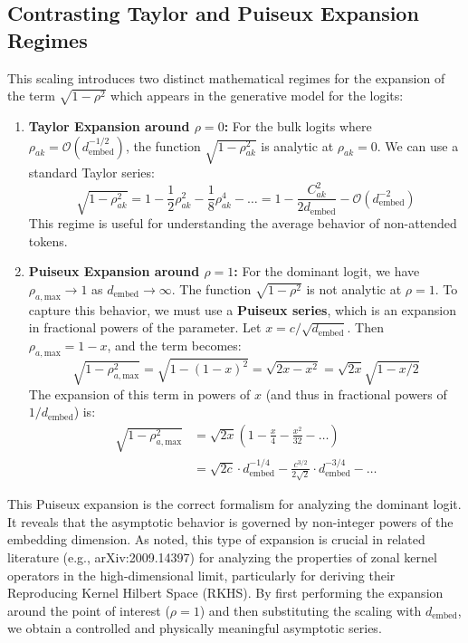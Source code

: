 \documentclass[12pt]{article}
\begin{document}
\subsection{Contrasting Taylor and Puiseux Expansion Regimes}
This scaling introduces two distinct mathematical regimes for the expansion of the term $\sqrt{1-\rho^2}$ which appears in the generative model for the logits:
\begin{enumerate}
    \item \textbf{Taylor Expansion around $\rho=0$:} For the bulk logits where $\rho_{ak} = \mathcal{O}(d_{\text{embed}}^{-1/2})$, the function $\sqrt{1-\rho_{ak}^2}$ is analytic at $\rho_{ak}=0$. We can use a standard Taylor series:
    \[ \sqrt{1-\rho_{ak}^2} = 1 - \frac{1}{2}\rho_{ak}^2 - \frac{1}{8}\rho_{ak}^4 - \dots = 1 - \frac{C_{ak}^2}{2 d_{\text{embed}}} - \mathcal{O}(d_{\text{embed}}^{-2}) \]
    This regime is useful for understanding the average behavior of non-attended tokens.

    \item \textbf{Puiseux Expansion around $\rho=1$:} For the dominant logit, we have $\rho_{a, \text{max}} \to 1$ as $d_{\text{embed}} \to \infty$. The function $\sqrt{1-\rho^2}$ is not analytic at $\rho=1$. To capture this behavior, we must use a \textbf{Puiseux series}, which is an expansion in fractional powers of the parameter. Let $x = c/\sqrt{d_{\text{embed}}}$. Then $\rho_{a, \text{max}} = 1-x$, and the term becomes:
    \[ \sqrt{1-\rho_{a, \text{max}}^2} = \sqrt{1-(1-x)^2} = \sqrt{2x - x^2} = \sqrt{2x}\sqrt{1 - x/2} \]
    The expansion of this term in powers of $x$ (and thus in fractional powers of $1/d_{\text{embed}}$) is:
    \begin{align*}
    \sqrt{1-\rho_{a, \text{max}}^2} &= \sqrt{2x} \left(1 - \frac{x}{4} - \frac{x^2}{32} - \dots\right) \\
    &= \sqrt{2c} \cdot d_{\text{embed}}^{-1/4} - \frac{c^{3/2}}{2\sqrt{2}} \cdot d_{\text{embed}}^{-3/4} - \dots
    \end{align*}
\end{enumerate}
This Puiseux expansion is the correct formalism for analyzing the dominant logit. It reveals that the asymptotic behavior is governed by non-integer powers of the embedding dimension. As noted, this type of expansion is crucial in related literature (e.g., arXiv:2009.14397) for analyzing the properties of zonal kernel operators in the high-dimensional limit, particularly for deriving their Reproducing Kernel Hilbert Space (RKHS). By first performing the expansion around the point of interest ($\rho=1$) and then substituting the scaling with $d_{\text{embed}}$, we obtain a controlled and physically meaningful asymptotic series.
\end{document}
